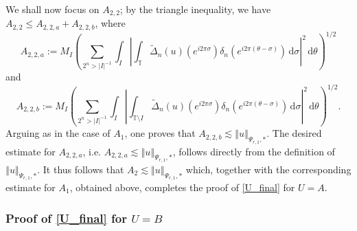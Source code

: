 \documentclass[a4paper, leqno, 10pt]{amsart}
\numberwithin{equation}{section}
\newcommand{\dd}{\mathrm{d}}
\newcommand{\T}{\mathbb{T}}
\newcommand{\norm}[1]{\left\Vert#1\right\Vert}
\newcommand{\abs}[1]{\left|#1\right|}
\begin{document}
We shall now focus on $A_{2,2}$; by the triangle inequality, we have $
A_{2,2} \leq A_{2,2,a} + A_{2,2,b} $,
where
\[
 A_{2,2,a} := 
M_I \left( \sum_{ 2^n > | I |^{-1} }  \int_I \abs{ \int_{\T}  \widetilde{\Delta}_n (u) (e^{i 2 \pi \sigma}) \delta_n \left( e^{i 2 \pi (\theta - \sigma ) } \right) \, \dd \sigma  }^2 \, \dd \theta \right)^{1/2}
\]
and
\[
A_{2,2,b} := 
M_I \left( \sum_{ 2^n > | I |^{-1} }  \int_I \abs{ \int_{\T \setminus I}  \widetilde{\Delta}_n (u) (e^{i 2 \pi \sigma}) \delta_n \left( e^{i 2 \pi (\theta - \sigma )  } \right)   \, \dd \sigma  }^2 \, \dd \theta \right)^{1/2}. 
\]
Arguing as in the case of  $A_1$, one proves that $A_{2,2,b} \lesssim \norm{u}_{\Psi_{r,1}, \ast} $. 
The desired estimate for $A_{2,2,a}$, i.e. $A_{2,2,a} \lesssim \norm{u}_{\Psi_{r,1}, \ast}$, follows directly from the definition of $\norm{u}_{\Psi_{r,1}, \ast}$.  
It thus follows that $A_2 \lesssim \norm{u}_{\Psi_{r,1}, \ast}$ which, together with the corresponding estimate for $A_1$, obtained above, completes the proof of \eqref{U_final} for $U=A$.  

%
\subsubsection{Proof of \eqref{U_final} for $U=B$} 
%
\end{document}

